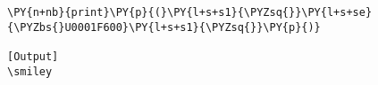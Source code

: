 \begin{Verbatim}[label=\makebox{\href{https://github.com/unipi-physics-labs/lab1-notes/tree/main/snippy/emoji.py}{https://github.com/.../emoji.py}},commandchars=\\\{\}]
\PY{n+nb}{print}\PY{p}{(}\PY{l+s+s1}{\PYZsq{}}\PY{l+s+se}{\PYZbs{}U0001F600}\PY{l+s+s1}{\PYZsq{}}\PY{p}{)}

[Output]
\smiley
\end{Verbatim}
